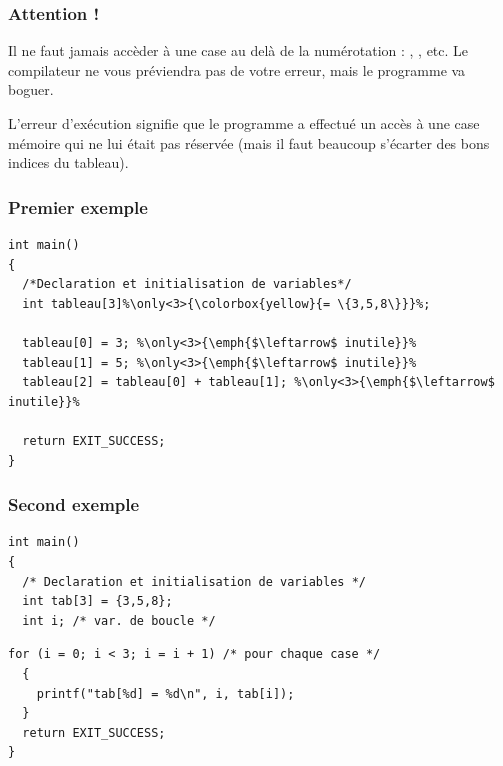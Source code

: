 \documentclass[xcolor=pdftex,svgnames,table]{beamer}
\begin{document}
\begin{frame}
  \frametitle{Attention !}
  \begin{alertenv}
Il ne faut jamais accèder à une case au delà de la numérotation : , , etc. Le compilateur ne vous préviendra pas de votre erreur, mais le programme va boguer.
\end{alertenv}
\pause

L'erreur d'exécution  signifie que le programme
a effectué un accès à une case mémoire qui ne lui était pas réservée
(mais il faut beaucoup s'écarter des bons indices du tableau).
\end{frame}

\begin{frame}[fragile]
  \frametitle{Premier exemple}
\begin{lstlisting}[escapechar={\%},basicstyle=\ttfamily]
int main()
{
  /*Declaration et initialisation de variables*/
  int tableau[3]%\only<3>{\colorbox{yellow}{= \{3,5,8\}}}%;

  tableau[0] = 3; %\only<3>{\emph{$\leftarrow$ inutile}}%
  tableau[1] = 5; %\only<3>{\emph{$\leftarrow$ inutile}}%
  tableau[2] = tableau[0] + tableau[1]; %\only<3>{\emph{$\leftarrow$ inutile}}%

  return EXIT_SUCCESS;
}
\end{lstlisting}
\end{frame}

\begin{frame}[fragile]
  \frametitle{Second exemple}
\begin{lstlisting}[basicstyle=\ttfamily\small]
int main()
{
  /* Declaration et initialisation de variables */
  int tab[3] = {3,5,8};
  int i; /* var. de boucle */
\end{lstlisting}
\pause
\begin{lstlisting}[basicstyle=\ttfamily\small]
  for (i = 0; i < 3; i = i + 1) /* pour chaque case */
  {
    printf("tab[%d] = %d\n", i, tab[i]);
  }
  return EXIT_SUCCESS;
}
\end{lstlisting}
\end{frame}
\end{document}
